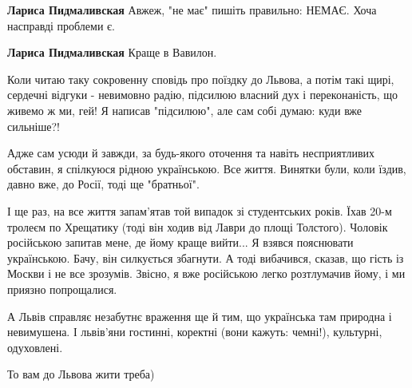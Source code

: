 \begin{itemize}
\begin{itemize}
\textbf{Лариса Пидмаливская} Авжеж, "не має" пишіть правильно: НЕМАЄ. Хоча насправді проблеми є.

 
\textbf{Лариса Пидмаливская} Краще в Вавилон.
\end{itemize}

 

Коли читаю таку сокровенну сповідь про поїздку до Львова, а потім такі щирі,
сердечні відгуки - невимовно радію, підсилюю власний дух і переконаність, що
живемо ж ми, гей! Я написав "підсилюю", але сам собі думаю: куди вже сильніше?!

Адже сам усюди й завжди, за будь-якого оточення та навіть несприятливих
обставин, я спілкуюся рідною українською. Все життя. Винятки були, коли їздив,
давно вже, до Росії, тоді ще "братньої". 

І ще раз, на все життя запам'ятав той випадок зі студентських років. Їхав 20-м
тролеєм по Хрещатику (тоді він ходив від Лаври до площі Толстого). Чоловік
російською запитав мене, де йому краще вийти... Я взявся пояснювати
українською. Бачу, він силкується збагнути. А тоді вибачився, сказав, що гість
із Москви і не все зрозумів. Звісно, я вже російською легко розтлумачив йому, і
ми приязно попрощалися.

А Львів справляє незабутнє враження ще й тим, що українська там природна і
невимушена. І львів'яни гостинні, коректні (вони кажуть: чемні!), культурні,
одуховлені.


 
То вам до Львова жити треба)

\begin{itemize}
 

\end{itemize}
\end{itemize}
